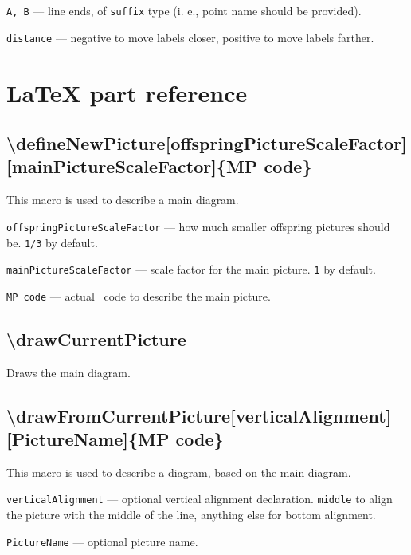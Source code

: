 \documentclass{ltxdoc}
\begin{document}
	\texttt{A, B} — line ends, of \texttt{suffix} type (i. e., point name should be provided).
	
	\texttt{distance} — negative to move labels closer, positive to move labels farther.


\section{LaTeX part reference}

\subsection{\textbackslash defineNewPicture[offspringPictureScaleFactor][mainPictureScaleFactor]\{MP code\}}

	This macro is used to describe a main diagram.

	\texttt{offspringPictureScaleFactor} — how much smaller offspring pictures should be. \texttt{1/3} by default.
	
	\texttt{mainPictureScaleFactor} — scale factor for the main picture. \texttt{1} by default.
	
	\texttt{MP code} — actual \METAPOST\ code to describe the main picture.

\subsection{\textbackslash drawCurrentPicture}
	
	Draws the main diagram.





\subsection{\textbackslash drawFromCurrentPicture[verticalAlignment][PictureName]\{MP code\}}

	This macro is used to describe a diagram, based on the main diagram.

	\texttt{verticalAlignment} — optional vertical alignment declaration. \texttt{middle} to align the picture with the middle of the line, anything else for bottom alignment.

	\texttt{PictureName} — optional picture name.
\end{document}
